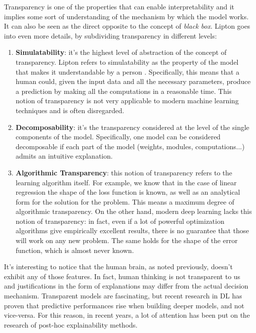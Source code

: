 Transparency is one of the properties that can enable interpretability and it implies some sort of understanding of the mechanism by which the model works. It can also be seen as the direct opposite to the concept of \textit{black box}. Lipton \cite{lipton2017mythos} goes into even more details, by subdividing transparency in different levels:
\begin{enumerate}
	\item \textbf{Simulatability}: it's the highest level of abstraction of the concept of transparency. Lipton refers to simulatability as the property of the model that makes it understandable by a person . Specifically, this means that a human could, given the input data and all the necessary parameters, produce a prediction by making all the computations in a reasonable time. This notion of transparency is not very applicable to modern machine learning techniques and is often disregarded. 
	\item \textbf{Decomposability}: it's the transparency considered at the level of the single components of the model. Specifically, one model can be considered decomposable if each part of the model (weights, modules, computations...) admits an intuitive explanation.
	\item \textbf{Algorithmic Transparency}: this notion of transparency refers to the learning algorithm itself. For example, we know that in the case of linear regression the shape of the loss function is known, as well as an analytical form for the solution for the problem. This means a maximum degree of algorithmic transparency. On the other hand, modern deep learning lacks this notion of transparency: in fact, even if a lot of powerful optimization algorithms give empirically excellent results, there is no guarantee that those will work on any new problem. The same holds for the shape of the error function, which is almost never known.
\end{enumerate}

It's interesting to notice that the human brain, as noted previously, doesn't exhibit any of those features. In fact, human thinking is not transparent to us and justifications in the form of explanations may differ from the actual decision mechanism. Transparent models are fascinating, but recent research in DL has proven that predictive performances rise when building deeper models, and not vice-versa. For this reason, in recent years, a lot of attention has been put on the research of post-hoc explainability methods.

